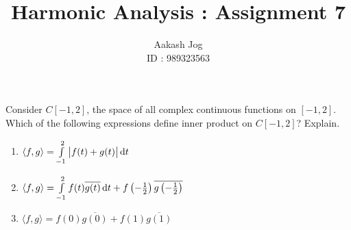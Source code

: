 \documentclass[fleqn, a4paper, 11pt, oneside]{amsart}
\title{Harmonic Analysis : Assignment 7}
\author
{
	Aakash Jog\\
	ID : 989323563
}
\date{\formatdate{22}{12}{2015}}
\theoremstyle{definition}
\theoremstyle{theorem}
\begin{document}

\maketitle

\begin{question}
	Consider $C[-1,2]$, the space of all complex continuous functions on $[-1,2]$.
	Which of the following expressions define inner product on $C[-1,2]$?
	Explain.
	\begin{enumerate}
		\item $\langle f,g \rangle = \int\limits_{-1}^{2} \left| f(t) + g(t) \right| \dif t$
		\item $\langle f,g \rangle = \int\limits_{-1}^{2} f(t) \overline{g(t)} \dif t + f\left( -\frac{1}{2} \right) \overline{g\left( -\frac{1}{2} \right)}$
		\item $\langle f,g \rangle = f(0) \overline{g(0)} + f(1) \overline{g(1)}$
	\end{enumerate}
\end{question}
\end{document}
